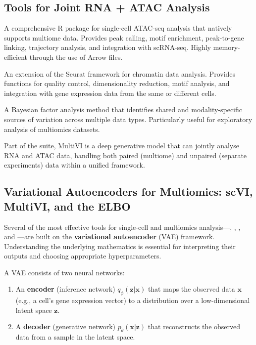 \subsection{Tools for Joint RNA + ATAC Analysis}
\label{subsec:multiomics:rna-atac-tools}

\begin{description}[style=nextline, itemsep=3pt]
  \item[\software{ArchR}] A comprehensive R package for single-cell ATAC-seq analysis that natively supports multiome data. Provides peak calling, motif enrichment, peak-to-gene linking, trajectory analysis, and integration with scRNA-seq. Highly memory-efficient through the use of Arrow files.

  \item[\software{Signac}] An extension of the Seurat framework for chromatin data analysis. Provides functions for quality control, dimensionality reduction, motif analysis, and integration with gene expression data from the same or different cells.

  \item[\software{MOFA+} (Multi-Omics Factor Analysis)] A Bayesian factor analysis method that identifies shared and modality-specific sources of variation across multiple data types. Particularly useful for exploratory analysis of multiomics datasets.

  \item[\software{MultiVI}] Part of the  suite, MultiVI is a deep generative model that can jointly analyse RNA and ATAC data, handling both paired (multiome) and unpaired (separate experiments) data within a unified framework.
\end{description}

\subsection{Variational Autoencoders for Multiomics: scVI, MultiVI, and the ELBO}
\label{subsec:multiomics:vae-elbo}

Several of the most effective tools for single-cell and multiomics analysis---, , , and ---are built on the \textbf{variational autoencoder} (VAE) framework. Understanding the underlying mathematics is essential for interpreting their outputs and choosing appropriate hyperparameters.

A VAE consists of two neural networks:
\begin{enumerate}[itemsep=2pt]
  \item An \textbf{encoder} (inference network) $q_\phi(\mathbf{z} | \mathbf{x})$ that maps the observed data $\mathbf{x}$ (e.g., a cell's gene expression vector) to a distribution over a low-dimensional latent space $\mathbf{z}$.
  \item A \textbf{decoder} (generative network) $p_\theta(\mathbf{x} | \mathbf{z})$ that reconstructs the observed data from a sample in the latent space.
\end{enumerate}


